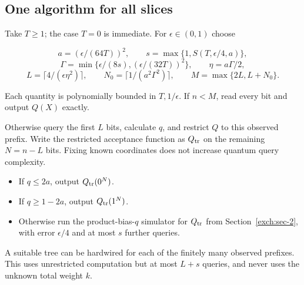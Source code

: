 \subsection{One algorithm for all slices}\label{exch:sec-5}

Take \(T\ge1\); the case \(T=0\) is immediate. For \(\epsilon\in(0,1)\)
choose

\[
a=(\epsilon/(64T))^2,\qquad s=\max\{1,S(T,\epsilon/4,a)\},
\] \[
\Gamma=\min\{\epsilon/(8s),(\epsilon/(32T))^2\},\qquad
\eta=a\Gamma/2,
\] \[
L=\lceil4/(\epsilon\eta^2)\rceil,\qquad
N_0=\lceil1/(a^2\Gamma^2)\rceil,\qquad
M=\max\{2L,L+N_0\}.
\]

Each quantity is polynomially bounded in \(T,1/\epsilon\). If \(n<M\),
read every bit and output \(Q(X)\) exactly.

Otherwise query the first \(L\) bits, calculate \(q\), and restrict
\(Q\) to this observed prefix. Write the restricted acceptance function
as \(Q_{\rm tr}\) on the remaining \(N=n-L\) bits. Fixing known
coordinates does not increase quantum query complexity.

\begin{itemize}
\tightlist
\item
  If \(q\le2a\), output \(Q_{\rm tr}(0^N)\).
\item
  If \(q\ge1-2a\), output \(Q_{\rm tr}(1^N)\).
\item
  Otherwise run the product-bias-\(q\) simulator for \(Q_{\rm tr}\) from
  Section~\ref{exch:sec-2}, with error \(\epsilon/4\)
  and at most \(s\) further queries.
\end{itemize}

A suitable tree can be hardwired for each of the finitely many observed
prefixes. This uses unrestricted computation but at most \(L+s\)
queries, and never uses the unknown total weight \(k\).
